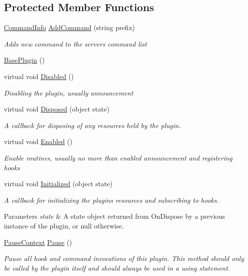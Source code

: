 \subsection*{Protected Member Functions}
\begin{DoxyCompactItemize}
\item 
\hyperlink{classOTA_1_1Command_1_1CommandInfo}{Command\+Info} \hyperlink{classOTA_1_1Plugin_1_1BasePlugin_a4f074493e57030ed27c34add3d0734ec}{Add\+Command} (string prefix)
\begin{DoxyCompactList}\small\item\em Adds new command to the server\textquotesingle{}s command list \end{DoxyCompactList}\item 
\hyperlink{classOTA_1_1Plugin_1_1BasePlugin_a995c9e3e16ac6a9aa30f6f23dfc880cd}{Base\+Plugin} ()
\item 
virtual void \hyperlink{classOTA_1_1Plugin_1_1BasePlugin_aa8de5b30178e6476d98c2e1e0056dbb4}{Disabled} ()
\begin{DoxyCompactList}\small\item\em Disabling the plugin, usually announcement \end{DoxyCompactList}\item 
virtual void \hyperlink{classOTA_1_1Plugin_1_1BasePlugin_a4927d6c4b5044757bbab734c25e51f4b}{Disposed} (object state)
\begin{DoxyCompactList}\small\item\em A callback for disposing of any resources held by the plugin. \end{DoxyCompactList}\item 
virtual void \hyperlink{classOTA_1_1Plugin_1_1BasePlugin_aa2f0b266439d709ec85c0b848a25fd2c}{Enabled} ()
\begin{DoxyCompactList}\small\item\em Enable routines, usually no more than enabled announcement and registering hooks \end{DoxyCompactList}\item 
virtual void \hyperlink{classOTA_1_1Plugin_1_1BasePlugin_a0f5be39a01c19564ffd7abf3ac9f329a}{Initialized} (object state)
\begin{DoxyCompactList}\small\item\em A callback for initializing the plugin\textquotesingle{}s resources and subscribing to hooks. 
\begin{DoxyParams}{Parameters}
{\em state} & A state object returned from On\+Dispose by a previous instance of the plugin, or null otherwise. \\
\hline
\end{DoxyParams}
\end{DoxyCompactList}\item 
\hyperlink{classOTA_1_1Plugin_1_1BasePlugin_1_1PauseContext}{Pause\+Context} \hyperlink{classOTA_1_1Plugin_1_1BasePlugin_afc6175023c63a7ea987f94c4ce96ad0c}{Pause} ()
\begin{DoxyCompactList}\small\item\em Pause all hook and command invocations of this plugin. This method should only be called by the plugin itself and should always be used in a using statement. 


\end{DoxyCompactList}
\end{DoxyCompactItemize}
